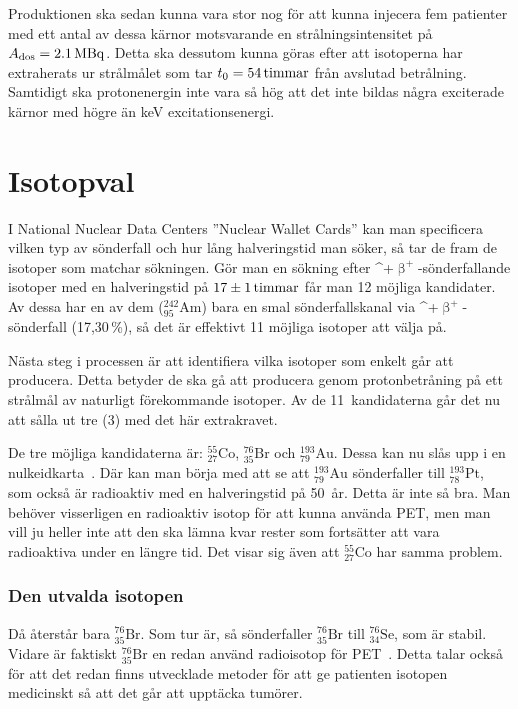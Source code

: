 \documentclass[11pt,a4paper, german, english, swedish
]{article}
\newcommand{\BP}{\ifmmode\upbeta^{+}\else$\upbeta^{+}$\fi}
\begin{document}
Produktionen ska sedan kunna vara stor nog för att kunna injecera fem patienter med ett antal av dessa kärnor motsvarande en strålningsintensitet på $A_\text{dos}=\unit[2.1]{MBq}$. Detta ska dessutom kunna göras efter att isotoperna har extraherats ur strålmålet som tar $t_0=\unit[54]{timmar}$ från avslutad betrålning. Samtidigt ska protonenergin inte vara så hög att det inte bildas några exciterade kärnor med högre än \unit[200]{keV} excitationsenergi. 



\section{Isotopval}
I National Nuclear Data Centers ''Nuclear Wallet Cards''\cite{NNDC_wallet} kan man specificera vilken typ av sönderfall och hur lång halveringstid man söker, så tar de fram de isotoper som matchar sökningen. Gör man en sökning efter \BP-sönderfallande isotoper med en halveringstid på $\unit[17\pm 1]{timmar}$ får man 12 möjliga kandidater. Av dessa har en av dem ($^{242}_{95}\!\mathrm{Am}$) bara en smal sönderfallskanal via \BP-sönderfall (17,30\,\%), så det är effektivt 11 möjliga isotoper att välja på.

Nästa steg i processen är att identifiera vilka isotoper som enkelt går att producera. Detta betyder de ska gå att producera genom protonbetråning på ett strålmål av naturligt förekommande isotoper\footnotemark{}. Av de 11~kandidaterna går det nu att sålla ut tre (3) med det här extrakravet. 

De tre möjliga kandidaterna är: $^{55}_{27}\mathrm{Co}$, $^{76}_{35}\mathrm{Br}$ och $^{193}_{79}\!\mathrm{Au}$. Dessa kan nu slås upp i en nulkeidkarta~\cite{NNDC_chart}. Där kan man börja med att se att $^{193}_{79}\!\mathrm{Au}$ sönderfaller till $^{193}_{78}\mathrm{Pt}$, som också är radioaktiv med en halveringstid på 50~år. Detta är inte så bra. Man behöver visserligen en radioaktiv isotop för att kunna använda PET, men man vill ju heller inte att den ska lämna kvar rester som fortsätter att vara radioaktiva under en längre tid. Det visar sig även att $^{55}_{27}\mathrm{Co}$ har samma problem.

\subsubsection*{Den utvalda isotopen}
Då återstår bara $^{76}_{35}\mathrm{Br}$. Som tur är, så sönderfaller $^{76}_{35}\mathrm{Br}$ till $^{76}_{34}\mathrm{Se}$, som är stabil. Vidare är faktiskt $^{76}_{35}\mathrm{Br}$ en redan använd radioisotop för PET~\cite{Lapi_PET,Valette_etal1993,Lovqvist_etal1997,Ribeiro_etal1999}. Detta talar också för att det redan finns utvecklade metoder för att ge patienten isotopen medicinskt så att det går att upptäcka tumörer. 
\end{document}
